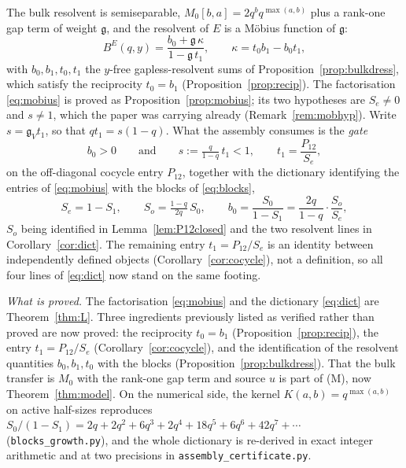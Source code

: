 \documentclass[11pt]{article}
\theoremstyle{plain}
\theoremstyle{definition}
\theoremstyle{remark}
\begin{document}
The bulk resolvent is semiseparable, $M_0[b,a]=2q^bq^{\max(a,b)}$ plus a rank-one gap term of
weight $\mathfrak g$, and the resolvent of $E$ is a M\"obius function of $\mathfrak g$:
\begin{equation}\label{eq:mobius}
   B^E(q,y)=\frac{b_0+\mathfrak g\,\kappa}{1-\mathfrak g\,t_1},\qquad \kappa=t_0b_1-b_0t_1,
\end{equation}
with $b_0,b_1,t_0,t_1$ the $y$-free gapless-resolvent sums of
Proposition~\ref{prop:bulkdress}, which satisfy the reciprocity $t_0=b_1$
(Proposition~\ref{prop:recip}). The factorisation \eqref{eq:mobius} is proved as
Proposition~\ref{prop:mobius}; its two hypotheses are $S_e\ne0$ and $s\ne1$, which the paper was
carrying already (Remark~\ref{rem:mobhyp}). Write $s=\mathfrak g_Vt_1$, so that $qt_1=s(1-q)$.
What the assembly consumes is the \emph{gate}
\begin{equation}\label{eq:gate}
   b_0>0\qquad\text{and}\qquad s:=\tfrac{q}{1-q}\,t_1<1,\qquad t_1=\frac{P_{12}}{S_e},
\end{equation}
on the off-diagonal cocycle entry $P_{12}$, together with the dictionary identifying the entries of
\eqref{eq:mobius} with the blocks of \eqref{eq:blocks},
\begin{equation}\label{eq:dict}
   S_e=1-S_1,\qquad S_o=\tfrac{1-q}{2q}\,S_0,\qquad
   b_0=\frac{S_0}{1-S_1}=\frac{2q}{1-q}\cdot\frac{S_o}{S_e},
\end{equation}
$S_o$ being identified in Lemma~\ref{lem:P12closed} and the two resolvent lines in
Corollary~\ref{cor:dict}. The remaining entry $t_1=P_{12}/S_e$ is an identity between
independently defined objects (Corollary~\ref{cor:cocycle}), not a definition, so all four lines
of \eqref{eq:dict} now stand on the same footing.

\emph{What is proved.} The factorisation \eqref{eq:mobius} and the dictionary \eqref{eq:dict} are
Theorem~\ref{thm:L}. Three ingredients previously listed as
verified rather than proved are now proved: the reciprocity $t_0=b_1$
(Proposition~\ref{prop:recip}), the entry $t_1=P_{12}/S_e$ (Corollary~\ref{cor:cocycle}), and the
identification of the resolvent quantities $b_0,b_1,t_0$ with the blocks
(Proposition~\ref{prop:bulkdress}). That the bulk transfer is $M_0$ with the rank-one gap term and
source $u$ is part of \textup{(M)}, now Theorem~\ref{thm:model}. On the numerical side, the kernel
$K(a,b)=q^{\max(a,b)}$ on active half-sizes reproduces
$S_0/(1-S_1)=2q+2q^2+6q^3+2q^4+18q^5+6q^6+42q^7+\cdots$ (\texttt{blocks\_growth.py}), and the
whole dictionary is re-derived in exact integer arithmetic and at two precisions in
\texttt{assembly\_certificate.py}.
\end{document}
